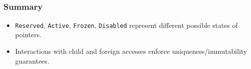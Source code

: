 \subsection*{}

\begin{frame}
    \frametitle{Summary}
    \begin{itemize}
        \item \texttt{Reserved}, \texttt{Active}, \texttt{Frozen}, \texttt{Disabled}
            represent different possible states of pointers.\\
        \item Interactions with child and foreign accesses enforce uniqueness/immutability guarantees.
    \end{itemize}
\end{frame}
